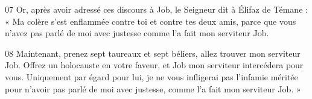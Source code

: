 07 Or, après avoir adressé ces discours à Job, le Seigneur dit à Élifaz de Témane : « Ma colère s’est enflammée contre toi et contre tes deux amis, parce que vous n’avez pas parlé de moi avec justesse comme l’a fait mon serviteur Job.

08 Maintenant, prenez sept taureaux et sept béliers, allez trouver mon serviteur Job. Offrez un holocauste en votre faveur, et Job mon serviteur intercédera pour vous. Uniquement par égard pour lui, je ne vous infligerai pas l’infamie méritée pour n’avoir pas parlé de moi avec justesse, comme l’a fait mon serviteur Job. »
